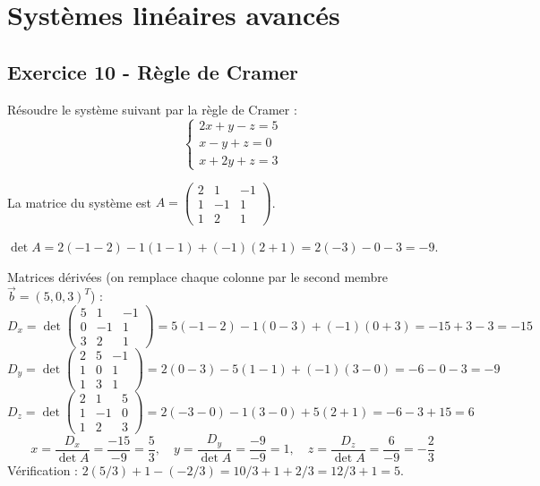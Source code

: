 \documentclass[12pt,a4paper]{article}
\begin{document}
\section{Systèmes linéaires avancés}

\subsection*{Exercice 10 - Règle de Cramer \niveau{\moyen}}

\begin{boiteexercice}
Résoudre le système suivant par la règle de Cramer :
\[
\begin{cases}2x + y - z = 5\\x - y + z = 0\\x + 2y + z = 3\end{cases}
\]
\end{boiteexercice}

\begin{boitecorrige}
La matrice du système est $A = \begin{pmatrix}2&1&-1\\1&-1&1\\1&2&1\end{pmatrix}$.

$\det A = 2(-1-2) - 1(1-1) + (-1)(2+1) = 2(-3) - 0 - 3 = -9$.

Matrices dérivées (on remplace chaque colonne par le second membre $\vec{b} = (5,0,3)^T$) :
\[
D_x = \det\begin{pmatrix}5&1&-1\\0&-1&1\\3&2&1\end{pmatrix} = 5(-1-2)-1(0-3)+(-1)(0+3) = -15+3-3=-15
\]
\[
D_y = \det\begin{pmatrix}2&5&-1\\1&0&1\\1&3&1\end{pmatrix} = 2(0-3)-5(1-1)+(-1)(3-0) = -6-0-3=-9
\]
\[
D_z = \det\begin{pmatrix}2&1&5\\1&-1&0\\1&2&3\end{pmatrix} = 2(-3-0)-1(3-0)+5(2+1) = -6-3+15=6
\]
\[
\boxed{x = \frac{D_x}{\det A} = \frac{-15}{-9} = \frac{5}{3}, \quad y = \frac{D_y}{\det A} = \frac{-9}{-9} = 1, \quad z = \frac{D_z}{\det A} = \frac{6}{-9} = -\frac{2}{3}}
\]
Vérification : $2(5/3)+1-(-2/3) = 10/3+1+2/3 = 12/3+1=5$.
\end{boitecorrige}
\end{document}
